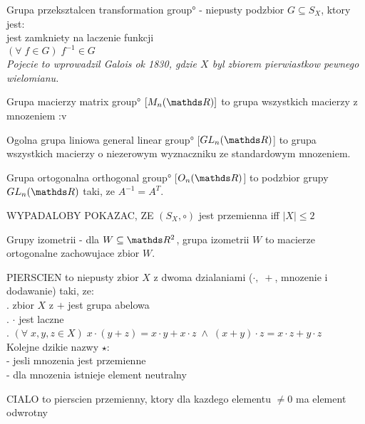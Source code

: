 \begin{multicols}{2}
    {\color{def}Grupa przeksztalcen} \ang{transformation group} - niepusty podzbior $G\subseteq S_X$, ktory jest:\\
        \point jest zamkniety na laczenie funkcji\\
        \point $(\forall\;f\in G)\;f^{-1}\in G$\\
    \emph{Pojecie to wprowadzil Galois ok 1830, gdzie $X$ byl zbiorem pierwiastkow pewnego wielomianu.}
    \bigskip

    {\color{def}Grupa macierzy} \ang{matrix group} $[M_n(\R)]$ to grupa wszystkich macierzy z mnozeniem :v
    \medskip

    {\color{def}Ogolna grupa liniowa} \ang{general linear group} [$GL_n(\R)$] to grupa wszystkich macierzy o niezerowym wyznaczniku ze standardowym mnozeniem.
    \medskip

    {\color{def}Grupa ortogonalna} \ang{orthogonal group} [$O_n(\R)$] to podzbior grupy $GL_n(\R)$ taki, ze $A^{-1}=A^T$.
    \bigskip

    {\color{cyan}WYPADALOBY POKAZAC, ZE $(S_X, \circ)$ jest przemienna iff $|X|\leq2$}
    \bigskip

    {\color{def}Grupy izometrii} - dla $W\subseteq \R^2$, grupa izometrii $W$ to macierze ortogonalne zachowujace zbior $W$.
    \bigskip

    {\color{def}PIERSCIEN} to niepusty zbior $X$ z dwoma dzialaniami ($\cdot,\;+$, mnozenie i dodawanie) taki, ze:\smallskip\\
    . zbior $X$ z $+$ jest grupa abelowa\smallskip\\
    . $\cdot$ jest laczne\smallskip\\
    . $(\forall\;x,y,z\in X)\;x\cdot(y+z)=x\cdot y+x\cdot z\;\land\;(x+y)\cdot z=x\cdot z+y\cdot z$\smallskip\\
    Kolejne dzikie nazwy $\star$:\smallskip\\
     - jesli mnozenia jest przemienne\smallskip\\
     - dla mnozenia istnieje element neutralny\medskip

    {\color{def}CIALO} to pierscien przemienny, ktory dla kazdego elementu $\neq 0$ ma element odwrotny

\end{multicols}\bigskip

\bigskip

